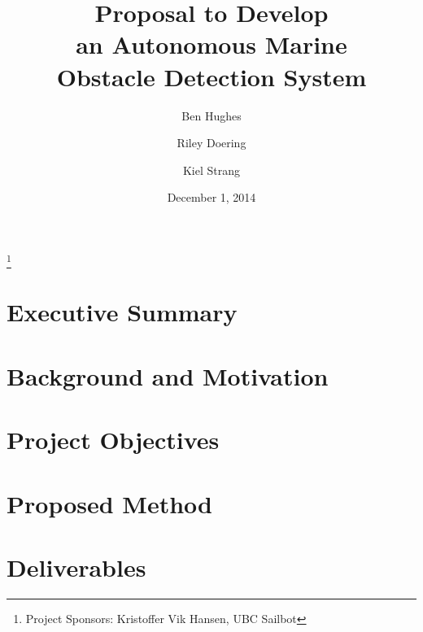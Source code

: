 \documentclass[amsmath, amssymb, aps, pra, 12pt]{revtex4-1}
\begin{document}
\title{Proposal to Develop\\an Autonomous Marine\\Obstacle Detection System}
\author{Ben Hughes}
\thanks{Project Sponsors: Kristoffer Vik Hansen, UBC Sailbot}
\author{Riley Doering}
\author{Kiel Strang}
\date{December 1, 2014}
\maketitle


\section*{Executive Summary}


\newpage
\tableofcontents

\makeatletter
\let\toc@pre\relax
\let\toc@post\relax
\makeatother 

\newpage
\listoffigures
\listoftables

\clearpage
\newpage
{}


\section{\label{sec:intro}Background and Motivation}


\section{\label{sec:objectives}Project Objectives}


\section{\label{sec:method}Proposed Method}


\section{\label{sec:deliverables}Deliverables}

\end{document}
